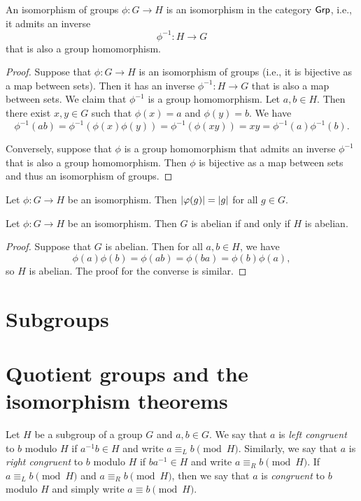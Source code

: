 \begin{theorem}
    An isomorphism of groups \(\phi: G \to H\) is an isomorphism in the category \(\mathsf{Grp}\), i.e., it admits an inverse
    \[
        \phi^{-1}: H \to G
    \]
    that is also a group homomorphism.
\end{theorem}

\begin{proof}
    Suppose that \(\phi: G \to H\) is an isomorphism of groups (i.e., it is bijective as a map between sets). Then it has an inverse \(\phi^{-1}: H \to G\) that is also a map between sets. We claim that \(\phi^{-1}\) is a group homomorphism. Let \(a, b \in H\). Then there exist \(x, y \in G\) such that \(\phi(x) = a\) and \(\phi(y) = b\). We have
    \[
        \phi^{-1}(ab) = \phi^{-1}(\phi(x)\phi(y)) = \phi^{-1}(\phi(xy)) = xy = \phi^{-1}(a)\phi^{-1}(b).
    \]
    
    Conversely, suppose that \(\phi\) is a group homomorphism that admits an inverse \(\phi^{-1}\) that is also a group homomorphism. Then \(\phi\) is bijective as a map between sets and thus an isomorphism of groups.
\end{proof}


\begin{theorem}
    Let \(\phi: G \to H\) be an isomorphism. Then \(\lvert \varphi(g) \rvert = \lvert g \rvert\) for all \(g \in G\).
\end{theorem}

\begin{theorem}
    Let \(\phi : G \to H\) be an isomorphism. Then \(G\) is abelian if and only if \(H\) is abelian.
\end{theorem}

\begin{proof}
    Suppose that \(G\) is abelian. Then for all \(a, b \in H\), we have
    \[
        \phi(a)\phi(b) = \phi(ab) = \phi(ba) = \phi(b)\phi(a),
    \]
    so \(H\) is abelian. The proof for the converse is similar.
\end{proof}

\section{Subgroups}


\clearpage
\section{Quotient groups and the isomorphism theorems}

\begin{definition}
    Let \(H\) be a subgroup of a group \(G\) and \(a, b \in G\). We say that \(a\) is \emph{left congruent} to \(b\) modulo \(H\) if \(a^{-1}b \in H\) and write \(a \equiv_L b \pmod{H}\). Similarly, we say that \(a\) is \emph{right congruent} to \(b\) modulo \(H\) if \(ba^{-1} \in H\) and write \(a \equiv_R b \pmod{H}\). If \(a \equiv_L b \pmod{H}\) and \(a \equiv_R b \pmod{H}\), then we say that \(a\) is \emph{congruent} to \(b\) modulo \(H\) and simply write \(a \equiv b \pmod{H}\).
\end{definition}


